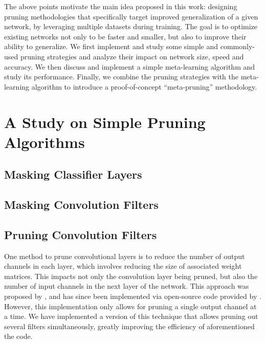 \documentclass{article}
\begin{document}
The above points motivate the main idea proposed in this work: designing pruning methodologies that specifically target improved generalization of a given network, by leveraging multiple datasets during training. The goal is to optimize existing networks not only to be faster and smaller, but also to improve their ability to generalize. We first implement and study some simple and commonly-used pruning strategies and analyze their impact on network size, speed and accuracy. We then discuss and implement a simple meta-learning algorithm and study its performance. Finally, we combine the pruning strategies with the meta-learning algorithm to introduce a proof-of-concept ``meta-pruning'' methodology.


\section{A Study on Simple Pruning Algorithms}

\subsection{Masking Classifier Layers}

\subsection{Masking Convolution Filters}

\subsection{Pruning Convolution Filters}

One method to prune convolutional layers is to reduce the number of output channels in each layer, which involves reducing the size of associated weight matrices. This impacts not only the convolution layer being pruned, but also the number of input channels in the next layer of the network. This approach was proposed by \cite{prune_transfer_learning}, and has since been implemented via open-source code provided by \cite{jacobgilblog}. However, this implementation only allows for pruning a single output channel at a time. We have implemented a version of this technique that allows pruning out several filters simultaneously, greatly improving the efficiency of aforementioned the code.
\end{document}
